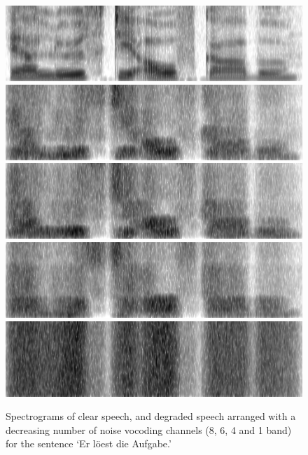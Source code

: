 \documentclass[a4paper, nobind]{templates/ociamthesis}
\begin{document}
\begin{figure}[!htpb]

{\centering \includegraphics[width=0.9\linewidth]{figures/materials/aufgabe_clear} \includegraphics[width=0.9\linewidth]{figures/materials/aufgabe_8bands} \includegraphics[width=0.9\linewidth]{figures/materials/aufgabe_6bands} \includegraphics[width=0.9\linewidth]{figures/materials/aufgabe_4bands} \includegraphics[width=0.9\linewidth]{figures/materials/aufgabe_1band} 

}

\caption{Spectrograms of clear speech, and degraded speech arranged with a decreasing number of noise vocoding channels (8, 6, 4 and 1 band) for the sentence `Er löest die Aufgabe.' }\label{fig:vocoding-spectrogram}
\end{figure}
\end{document}
